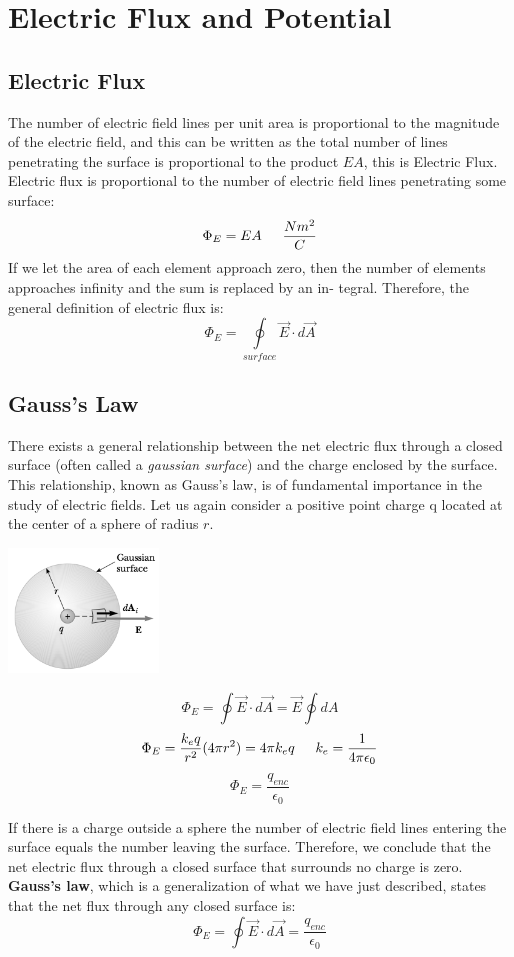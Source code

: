 \documentclass{article}
\begin{document}
\section{Electric Flux and Potential}
	\subsection{Electric Flux}
    	The number of electric field lines per unit area is proportional to the magnitude of the electric field, and this can be written as the total number of lines penetrating the surface is proportional to the product $EA$, this is Electric Flux. Electric flux is proportional to the number of electric field lines penetrating some surface:
        \[
        	\Phi_E=EA \indent\frac{Nm^2}{C}
        \]
        If we let the area of each element approach zero, then the number of elements approaches infinity and the sum is replaced by an in- tegral. Therefore, the general definition of electric flux is:
        \[
        	\Phi_E=\underset{surface}{\oint}\vec{E}\cdot d\vec{A}
        \]
        
	\subsection{Gauss's Law}
    	There exists a general relationship between the net electric flux through a closed surface (often called a \textit{gaussian surface}) and the charge enclosed by the surface. This relationship, known as Gauss’s law, is of fundamental importance in the study of electric fields. Let us again consider a positive point charge q located at the center of a sphere of radius $r$.
        \begin{multicols}{2}
        	\centerline{\includegraphics[width=4cm]{gaussLaw.png}}
		\columnbreak
        	\[
            	\Phi_E=\oint\vec{E}\cdot d\vec{A}=\vec{E}\oint dA
			\]
            \[
            	\Phi_E=\frac{k_eq}{r^2}(4\pi r^2)=4\pi k_eq \indent
                k_e=\frac{1}{4\pi\epsilon_0}
            \]
            \[
            	\Phi_E=\frac{q_{enc}}{\epsilon_0}
            \]
		\end{multicols}
        If there is a charge outside a sphere the number of electric field lines entering the surface equals the number leaving the surface. Therefore, we conclude that the net electric flux through a closed surface that surrounds no charge is zero. \textbf{Gauss’s law}, which is a generalization of what we have just described, states that the net flux through any closed surface is:
        \[
        	\Phi_E=\oint\vec{E}\cdot d\vec{A}=\frac{q_{enc}}{\epsilon_0}
        \]
        
\end{document}
